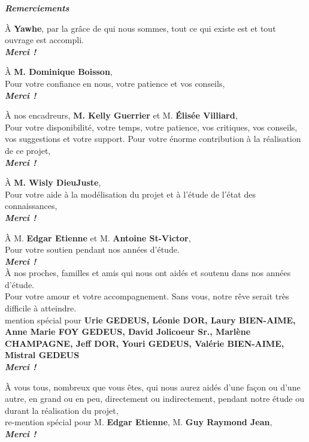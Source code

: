 \newpage

\begin{center}
	\textbf{\textit{\Huge{\textcolor{myblue}{Remerciements}}}}
	\vspace{2cm}
	
	\begin{minipage}{0.75\textwidth}
		\`A \textbf{Yawhe}, par la gr\^ace de qui nous sommes, tout ce qui existe est et tout ouvrage est accompli. \\
		\textbf{\textit{Merci !}}
			
		\`A \textbf{M. Dominique Boisson},\\
		Pour votre confiance en nous, votre patience et vos conseils, \\
		\textbf{\textit{Merci !}}
				
		\`A nos encadreurs, \textbf{M. Kelly Guerrier} et M. \textbf{\'Elis\'ee Villiard},\\
		Pour votre disponibilit\'e, votre temps, votre patience, vos critiques, vos conseils, vos suggestions et votre support. Pour votre \'enorme contribution \`a la r\'ealisation de ce projet,\\
		\textbf{\textit{Merci !}}
				
		\`A \textbf{M. Wisly DieuJuste}, \\
		Pour votre aide \`a la mod\'elisation du projet et \`a l'\'etude de l'\'etat des connaissances,\\
		\textbf{\textit{Merci !}}
				
		\`A M. \textbf{Edgar Etienne} et M. \textbf{Antoine St-Victor},\\
		Pour votre soutien pendant nos ann\'ees d'\'etude.\\
		\textbf{\textit{Merci !}}\\

		\vspace{5pt}
		\`A nos proches, familles et amis qui nous ont aid\'es et soutenu dans nos ann\'ees d'\'etude. \\
		Pour votre amour et votre accompagnement. Sans vous, notre r\^eve serait tr\`es difficile \`a atteindre.\\
		mention sp\'ecial pour \textbf{Urie GEDEUS, L\'eonie DOR, Laury BIEN-AIME, Anne Marie FOY GEDEUS, David Jolicoeur Sr., Marl\`ene CHAMPAGNE, Jeff DOR, Youri GEDEUS, Val\'erie BIEN-AIME, Mistral GEDEUS} \\
		\textbf{\textit{Merci !}}
				
		\vspace{5pt}
		\`A vous tous, nombreux que vous \^etes, qui nous aurez aid\'es d'une fa\c{c}on ou d'une autre, en grand ou en peu, directement ou indirectement, pendant notre \'etude ou durant la r\'ealisation du projet, \\
		re-mention sp\'ecial pour M. \textbf{Edgar Etienne}, M. \textbf{Guy Raymond Jean}, \\
		\textbf{\textit{Merci !}}	
		

\end{minipage}
\end{center}
